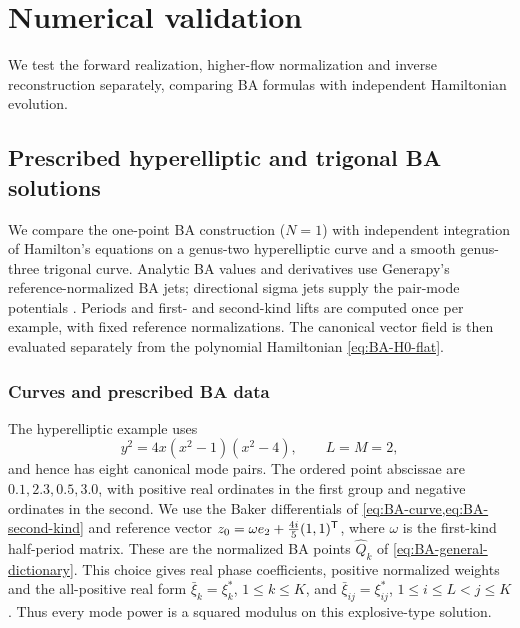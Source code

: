 \section{Numerical validation}\label{sec:numerical-validation}

We test the forward realization, higher-flow normalization and inverse
reconstruction separately, comparing BA formulas with independent
Hamiltonian evolution.

\subsection{Prescribed hyperelliptic and trigonal BA solutions}
\label{sec:numeric-prescribed-BA}

We compare the one-point BA construction ($N=1$) with independent integration of
Hamilton's equations on a genus-two hyperelliptic curve and a smooth
genus-three trigonal curve. Analytic BA values and derivatives use
Generapy's reference-normalized BA jets; directional sigma jets supply
the pair-mode potentials \cite{Generapy}. Periods and first- and
second-kind lifts are computed once per example, with fixed reference
normalizations. The canonical vector field is
then evaluated separately from the polynomial Hamiltonian
\cref{eq:BA-H0-flat}.

\subsubsection{Curves and prescribed BA data}

The hyperelliptic example uses
\begin{equation}\label{eq:numeric-hyperelliptic-curve}
 y^2=4x(x^2-1)(x^2-4),\qquad L=M=2,
\end{equation}
and hence has eight canonical mode pairs. The ordered point
abscissae are $0.1,2.3,0.5,3.0$, with positive real ordinates in the
first group and negative ordinates in the second. We use the Baker
differentials of \cref{eq:BA-curve,eq:BA-second-kind} and reference
vector $z_0=\omega e_2+\tfrac{4i}{5}(1,1)^{\mathsf T}$, where
$\omega$ is the first-kind half-period matrix. These are the normalized
BA points $\widehat Q_k$ of \cref{eq:BA-general-dictionary}.
This choice gives real phase coefficients, positive normalized weights
and the all-positive real form
$\bar\xi_k=\xi_k^*$, $1\leq k\leq K$, and
$\bar\xi_{ij}=\xi_{ij}^*$, $1\leq i\leq L<j\leq K$.
Thus every mode power is a squared modulus on this explosive-type solution.

